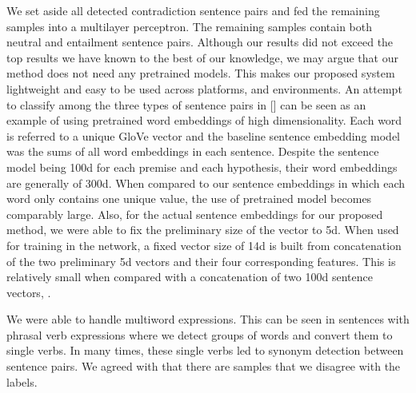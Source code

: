 \documentclass[11pt]{article}
\begin{document}
We set aside all detected contradiction sentence pairs and fed the remaining samples into a multilayer perceptron. The remaining samples contain both neutral and entailment sentence pairs. Although our results did not exceed the top results we have known to the best of our knowledge, we may argue that our method does not need any pretrained models. This makes our proposed system lightweight and easy to be used across platforms, and environments. An attempt to classify among the three types of sentence pairs in [] can be seen as an example of using pretrained word embeddings of high dimensionality. Each word is referred to a unique GloVe vector and the baseline sentence embedding model was the sums of all word embeddings in each sentence. Despite the sentence model being 100d for each premise and each hypothesis, their word embeddings are generally of 300d. When compared to our sentence embeddings in which each word only contains one unique value, the use of pretrained model becomes comparably large. Also, for the actual sentence embeddings for our proposed method, we were able to fix the preliminary size of the vector to 5d. When used for training in the network, a fixed vector size of 14d is built from concatenation of the two preliminary 5d vectors and their four corresponding features. This is relatively small when compared with a concatenation of two 100d sentence vectors, \citep{bowman-etal-2015-large}. 

We were able to handle multiword expressions. This can be seen in sentences with phrasal verb expressions where we detect groups of words and convert them to single verbs. In many times, these single verbs led to synonym detection between sentence pairs.
We agreed with \citep{chen-etal-2021-neurallog} that there are samples that we disagree with the labels. 






\end{document}
